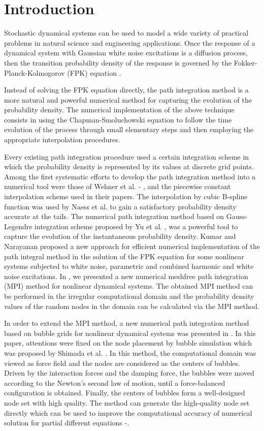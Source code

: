 \documentclass[a4paper, 11pt, final]{article}
\begin{document}
\section{Introduction}
Stochastic dynamical systems can be used to model a wide variety of
practical problems in natural science and engineering applications.
Once the response of a dynamical system with Gaussian white noise
excitations is a diffusion process, then the transition probability
density of the response is governed by the Fokker-Planck-Kolmogorov
(FPK) equation \cite{ZWQ2017,GCW1986}.

Instead of solving the FPK equation directly, the path integration
method is a more natural and powerful numerical method for capturing
the evolution of the probability density. The numerical implementation
of the above technique consists in using the Chapman-Smoluchowski
equation to follow the time evolution of the process through small
elementary steps and then employing the appropriate interpolation
procedures. 

Every existing path integration procedure used a certain integration
scheme in which the probability density is represented by its values
at discrete grid points. Among the first systematic efforts to develop
the path integration method into a numerical tool were those of Wehner
et al. \cite{1}-\cite{3} , and the piecewise constant interpolation scheme used in
their papers. The interpolation by cubic B-spline function was used by
Naess et al. \cite{4} to gain a satisfactory probability density accurate
at the tails. The numerical path integration method based on Gauss-Legendre
integration scheme proposed by Yu et al. \cite{5, 6}, was a powerful tool to
capture the evolution of the instantaneous probability density. Kumar
and Narayanan \cite{7, 8} proposed a new approach for efficient numerical
implementation of the path integral method in the solution of the FPK
equation for some nonlinear systems subjected to white noise, parametric
and combined harmonic and white noise excitations. In \cite{9}, we presented
a new numerical meshfree path integration (MPI) method for nonlinear
dynamical systems. The obtained MPI method can be performed in the
irregular computational domain and the probability density values
of the random nodes in the domain can be calculated via the MPI method.

In order to extend the MPI method, a new numerical path integration
method based on bubble grids for nonlinear dynamical systems was
presented in \cite{10}. In this paper, attentions were fixed on the node
placement by bubble simulation which was proposed
by Shimada et al. \cite{11}. In this method, the computational domain
was viewed as force field and the nodes are considered as the centers of
bubbles. Driven by the interaction forces and the damping force, the bubbles
were moved according to the Newton’s second law of motion, until a
force-balanced configuration is obtained. Finally, the centers of
bubbles form a well-designed node set with high quality. The method
can generate the high-quality node set directly which can be used to
improve the computational accuracy of numerical solution for partial
different equations \cite{12}-\cite{17}.
\end{document}
